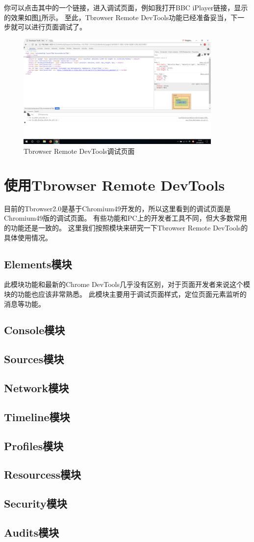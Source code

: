 你可以点击其中的一个链接，进入调试页面，例如我打开BBC iPlayer链接，显示的效果如图\ref{fig:debug_page}所示。
至此，Tbrowser Remote DevTools功能已经准备妥当，下一步就可以进行页面调试了。
\begin{figure}[H] 
\centering 
\includegraphics[width=0.9\textwidth]{image/devtools_study/debug_page.png} 
\caption{Tbrowser Remote DevTools调试页面} \label{fig:debug_page} 
\end{figure}

\section{使用Tbrowser Remote DevTools}
目前的Tbrowser2.0是基于Chromium49开发的，所以这里看到的调试页面是Chromium49版的调试页面。
有些功能和PC上的开发者工具不同，但大多数常用的功能还是一致的。
这里我们按照模块来研究一下Tbrowser Remote DevTools的具体使用情况。

\subsection{Elements模块}
此模块功能和最新的Chrome DevTools几乎没有区别，对于页面开发者来说这个模块的功能也应该非常熟悉。
此模块主要用于调试页面样式，定位页面元素监听的消息等功能。

\subsection{Console模块}
\subsection{Sources模块}
\subsection{Network模块}
\subsection{Timeline模块}
\subsection{Profiles模块}
\subsection{Resourcess模块}
\subsection{Security模块}
\subsection{Audits模块}